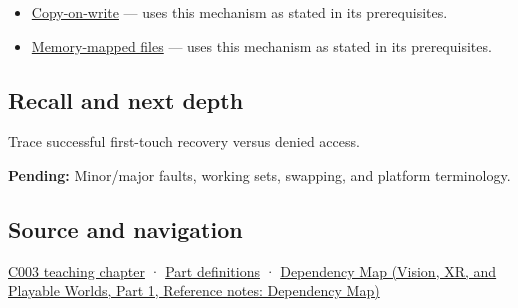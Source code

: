 \begin{itemize}
\tightlist
\item
  \hyperref[appendix-7a06e5baac04]{Copy-on-write} --- uses this mechanism as stated in its prerequisites.
\item
  \hyperref[appendix-313ee7a0ba7b]{Memory-mapped files} --- uses this mechanism as stated in its prerequisites.
\end{itemize}

\subsection{Recall and next depth}\label{appendix-cc0909a7ef14-recall-and-next-depth}

\hypertarget{appendix-cc0909a7ef14-recall-and-next-depth}{}

Trace successful first-touch recovery versus denied access.

\textbf{Pending:} Minor/major faults, working sets, swapping, and platform terminology.

\subsection{Source and navigation}\label{appendix-cc0909a7ef14-source-and-navigation}

\hypertarget{appendix-cc0909a7ef14-source-and-navigation}{}

\hyperref[01-foundations-i-ch002-where-the-bytes-live]{C003 teaching chapter} · \hyperref[appendix-fd090d982a15-m003---parts-41-60]{Part definitions} · \href{../07-Vision-XR-and-Playable-Worlds-P01/main.pdf\#appendix-4ad47bdd269a}{Dependency Map (Vision, XR, and Playable Worlds, Part 1, Reference notes: Dependency Map)}
